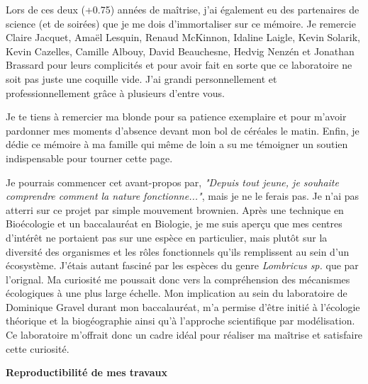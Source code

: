 
Lors de ces deux (+0.75) années de maîtrise, j'ai également eu des partenaires de science (et de
soirées) que je me dois d'immortaliser sur ce mémoire. Je remercie Claire Jacquet, Amaël Lesquin,
Renaud McKinnon, Idaline Laigle, Kevin Solarik, Kevin Cazelles, Camille Albouy, David Beauchesne,
Hedvig Nenzén et Jonathan Brassard pour leurs complicités et pour avoir fait en sorte que ce
laboratoire ne soit pas juste une coquille vide. J'ai grandi personnellement et professionnellement
grâce à plusieurs d'entre vous.  

Je te tiens à remercier ma blonde pour sa patience exemplaire et pour m'avoir pardonner mes moments
d'absence devant mon bol de céréales le matin. Enfin, je dédie ce mémoire à ma famille qui même de
loin a su me témoigner un soutien indispensable pour tourner cette page. 


\avantpropos


Je pourrais commencer cet avant-propos par, \textit{"Depuis tout jeune, je souhaite comprendre
comment la nature fonctionne..."}, mais je ne le ferais pas. Je n'ai pas atterri sur ce projet par
simple mouvement brownien. Après une technique en Bioécologie et un baccalauréat en Biologie, je me
suis aperçu que mes centres d'intérêt ne portaient pas sur une espèce en particulier, mais plutôt
sur la diversité des organismes et les rôles fonctionnels qu'ils remplissent au sein d'un
écosystème. J'étais autant fasciné par les espèces du genre \textit{Lombricus sp.} que par
l'orignal. Ma curiosité me poussait donc vers la compréhension des mécanismes écologiques à une plus
large échelle. Mon implication au sein du laboratoire de Dominique Gravel durant mon baccalauréat,
m'a permise d'être initié à l'écologie théorique et la biogéographie ainsi qu'à l'approche
scientifique par modélisation. Ce laboratoire m'offrait donc un cadre idéal pour réaliser ma
maîtrise et satisfaire cette curiosité. 

\noindent\textbf{Reproductibilité de mes travaux}


